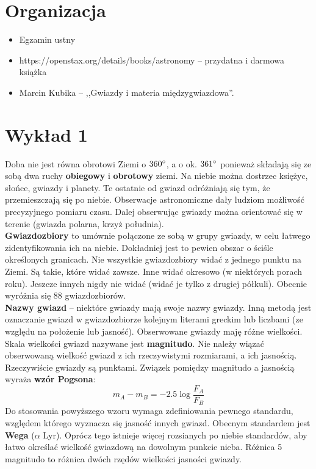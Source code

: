 \documentclass[../index.tex]{subfiles}
\begin{document}
    \section*{Organizacja}
        \begin{itemize}
            \item Egzamin ustny
            \item https://openstax.org/details/books/astronomy \--- przydatna i darmowa książka
            \item Marcin Kubika \--- ,,Gwiazdy i materia międzygwiazdowa''.
        \end{itemize}
    \section{Wykład 1}
        Doba nie jest równa obrotowi Ziemi o \(360^\circ\), a o ok. \(361^\circ\) ponieważ składają się ze sobą dwa ruchy \textbf{obiegowy} i \textbf{obrotowy} ziemi. Na niebie można dostrzec księżyc, słońce, gwiazdy i planety. Te ostatnie od gwiazd odróżniają się tym, że przemieszczają się po niebie. Obserwacje astronomiczne dały ludziom możliwość precyzyjnego pomiaru czasu. Dalej obserwując gwiazdy można orientować się w terenie (gwiazda polarna, krzyż południa).\\
        \textbf{Gwiazdozbiory} to umównie połączone ze sobą w grupy gwiazdy, w celu łatwego zidentyfikowania ich na niebie. Dokładniej jest to pewien obszar o ściśle określonych granicach. Nie wszystkie gwiazdozbiory widać z jednego punktu na Ziemi. Są takie, które widać zawsze. Inne widać okresowo (w niektórych porach roku). Jeszcze innych nigdy nie widać (widać je tylko z drugiej półkuli). Obecnie wyróżnia się 88 gwiazdozbiorów. \\
        \textbf{Nazwy gwiazd} \--- niektóre gwiazdy mają swoje nazwy gwiazdy. Inną metodą jest oznaczanie gwiazd w gwiazdozbiorze kolejnym literami greckim lub liczbami (ze względu na położenie lub jasność).
        Obserwowane gwiazdy maję różne wielkości. Skala wielkości gwiazd nazywane jest \textbf{magnitudo}. Nie należy wiązać obserwowaną wielkość gwiazd z ich rzeczywistymi rozmiarami, a ich jasnością. Rzeczywiście gwiazdy są punktami. Związek pomiędzy magnitudo a jasnością wyraża \textbf{wzór Pogsona}:
        \begin{equation}
            m_A - m_B = - 2.5 \log \frac{F_A}{F_B} 
        \end{equation} 
        Do stosowania powyższego wzoru wymaga zdefiniowania pewnego standardu, względem którego wyznacza się jasność innych gwiazd. Obecnym standardem jest \textbf{Wega} (\(\alpha\)\! Lyr). Oprócz tego istnieje więcej rozsianych po niebie standardów, aby łatwo określać wielkość gwiazdową na dowolnym punkcie nieba. Różnica 5 magnitudo to różnica dwóch rzędów wielkości jasności gwiazdy.\\
\end{document}
